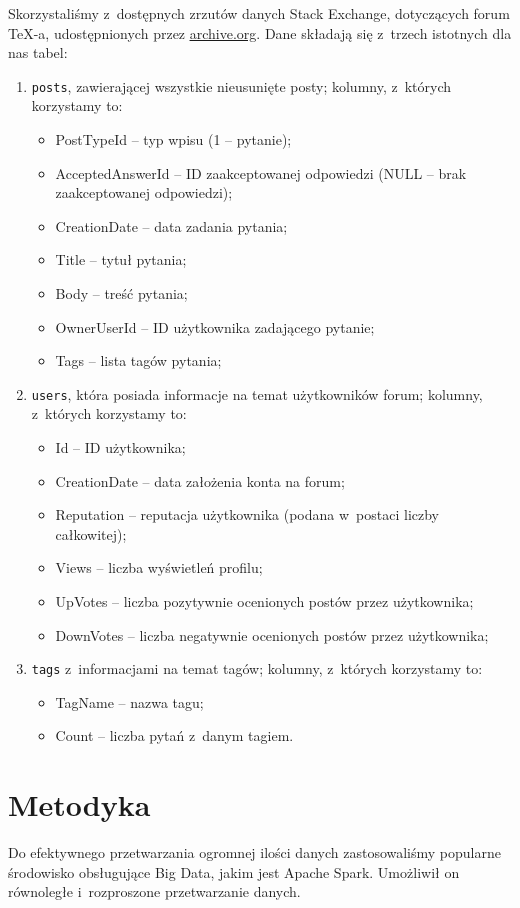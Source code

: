 \documentclass[12pt]{article}
\begin{document}
	Skorzystaliśmy z~dostępnych zrzutów danych Stack Exchange, dotyczących forum \TeX-a, udostępnionych przez \underline{\href{https://archive.org/details/stackexchange}{archive.org}}.
	Dane składają się z~trzech istotnych dla nas tabel:
	\begin{enumerate}
		\item \verb|posts|, zawierającej wszystkie nieusunięte posty; kolumny, z~których korzystamy to:
		\begin{itemize}
			\item PostTypeId -- typ wpisu (1 -- pytanie);
			\item AcceptedAnswerId -- ID zaakceptowanej odpowiedzi (NULL -- brak zaakceptowanej odpowiedzi);
			\item CreationDate -- data zadania pytania;
			\item Title -- tytuł pytania;
			\item Body -- treść pytania;
			\item OwnerUserId -- ID użytkownika zadającego pytanie;
			\item Tags -- lista tagów pytania;
		\end{itemize}
		\item \verb|users|, która posiada informacje na temat użytkowników forum; kolumny, z~których korzystamy to:
		\begin{itemize}
			\item Id -- ID użytkownika;
			\item CreationDate -- data założenia konta na forum;
			\item Reputation -- reputacja użytkownika (podana w~postaci liczby całkowitej);
			\item Views -- liczba wyświetleń profilu;
			\item UpVotes -- liczba pozytywnie ocenionych postów przez użytkownika;
			\item DownVotes -- liczba negatywnie ocenionych postów przez użytkownika;
		\end{itemize}
		\item \verb|tags| z~informacjami na temat tagów; kolumny, z~których korzystamy to:
		\begin{itemize}
			\item TagName -- nazwa tagu;
			\item Count -- liczba pytań z~danym tagiem.
		\end{itemize}
	\end{enumerate}

	\section{Metodyka}\label{sec:metodyka}
	Do efektywnego przetwarzania ogromnej ilości danych zastosowaliśmy popularne środowisko obsługujące Big Data, jakim jest Apache Spark.
	Umożliwił on równoległe i~rozproszone przetwarzanie danych.
\end{document}
